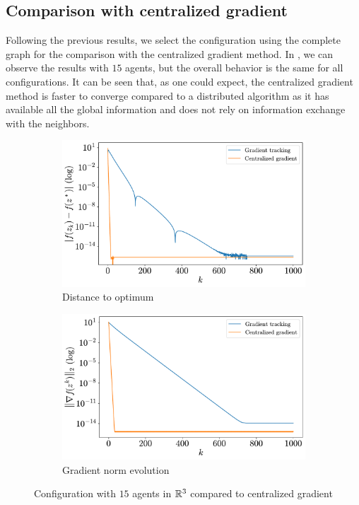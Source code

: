 \documentclass[a4paper,11pt,oneside]{book}
\begin{document}
\subsection{Comparison with centralized gradient}

Following the previous results, we select the configuration using the complete graph for the comparison with the centralized gradient method. In , we can observe the results with $15$ agents, but the overall behavior is the same for all configurations. It can be seen that, as one could expect, the centralized gradient method is faster to converge compared to a distributed algorithm as it has available all the global information and does not rely on information exchange with the neighbors.

\begin{figure}[ht]
      \centering
      \begin{subfigure}[t]{0.49\textwidth}
            \centering
            \includegraphics[width=\linewidth]{./figs/quadratic/distance_centralized_15_3_1000.pdf} 
            \caption{Distance to optimum}
      \end{subfigure}
      \hfill
      \begin{subfigure}[t]{0.49\textwidth}
            \centering
            \includegraphics[width=\linewidth]{./figs/quadratic/gradient_centralized_15_3_1000.pdf} 
            \caption{Gradient norm evolution}
      \end{subfigure}
      \caption{Configuration with $15$ agents in ${\mathbb{R}}^{3}$ compared to centralized gradient}
      \label{fig:quadratic_centralized_15_3}
\end{figure}
\end{document}
